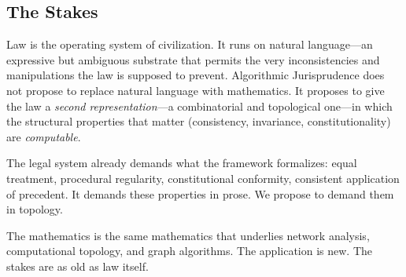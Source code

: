 \documentclass[12pt]{article}
\theoremstyle{definition}
\theoremstyle{remark}
\begin{document}
\subsection{The Stakes}

Law is the operating system of civilization.  It runs on natural language---an expressive but ambiguous substrate that permits the very inconsistencies and manipulations the law is supposed to prevent.  Algorithmic Jurisprudence does not propose to replace natural language with mathematics.  It proposes to give the law a \emph{second representation}---a combinatorial and topological one---in which the structural properties that matter (consistency, invariance, constitutionality) are \emph{computable}.

The legal system already demands what the framework formalizes: equal treatment, procedural regularity, constitutional conformity, consistent application of precedent.  It demands these properties in prose.  We propose to demand them in topology.

The mathematics is the same mathematics that underlies network analysis, computational topology, and graph algorithms.  The application is new.  The stakes are as old as law itself.
\end{document}
